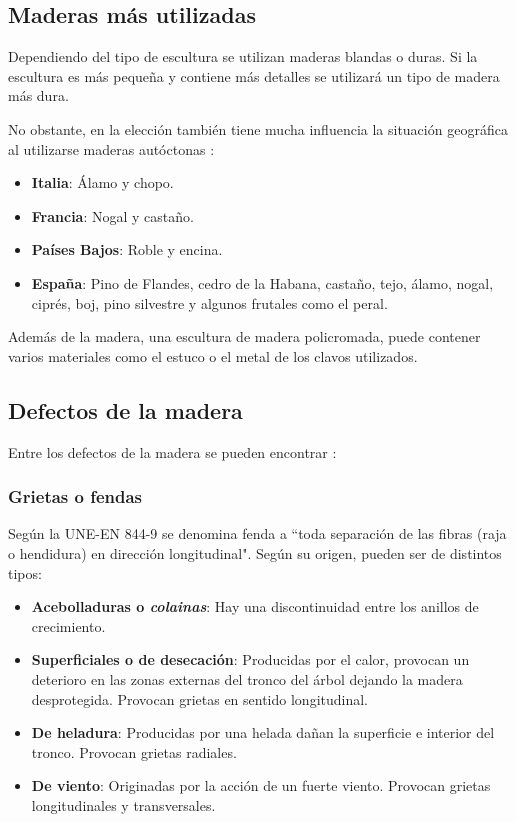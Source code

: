 \subsection{Maderas más utilizadas}

Dependiendo del tipo de escultura se utilizan maderas blandas o duras. Si la escultura es más pequeña y contiene más detalles se utilizará un tipo de madera más dura.

No obstante, en la elección también tiene mucha influencia la situación geográfica al utilizarse maderas autóctonas \cite{tc_esculturas}:

\begin{itemize}
	\item \textbf{Italia}: Álamo y chopo.
	\item \textbf{Francia}: Nogal y castaño.
	\item \textbf{Países Bajos}: Roble y encina.
	\item \textbf{España}: Pino de Flandes, cedro de la Habana, castaño, tejo, álamo, nogal, ciprés, boj, pino silvestre y algunos frutales como el peral.
\end{itemize}

Además de la madera, una escultura de madera policromada, puede contener varios materiales como el estuco o el metal de los clavos utilizados.

\subsection{Defectos de la madera}

Entre los defectos de la madera se pueden encontrar \cite{tc_esculturas}:

\subsubsection{Grietas o fendas}
Según la UNE-EN 844-9 se denomina fenda a ``toda separación de las fibras (raja o hendidura) en dirección longitudinal". Según su origen, pueden ser de distintos tipos: 

\begin{itemize}
	\item \textbf{Acebolladuras o \textit{colainas}}: Hay una discontinuidad entre los anillos de crecimiento.
	\item \textbf{Superficiales o de desecación}: Producidas por el calor, provocan un deterioro en las zonas externas del tronco del árbol dejando la madera desprotegida. Provocan grietas en sentido longitudinal.
	\item \textbf{De heladura}: Producidas por una helada dañan la superficie e interior del tronco. Provocan grietas radiales.
	\item \textbf{De viento}: Originadas por la acción de un fuerte viento. Provocan grietas longitudinales y transversales.
\end{itemize}

